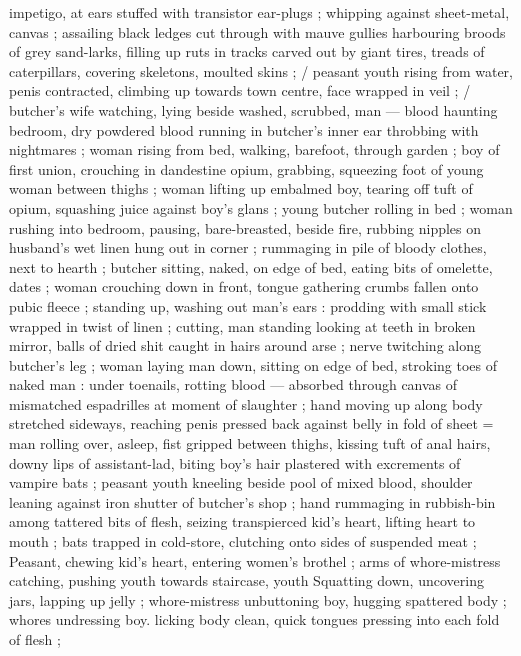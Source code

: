 impetigo, at ears stuffed with transistor ear-plugs ; whipping against 
sheet-metal, canvas ; assailing black ledges cut through with mauve 
gullies harbouring broods of grey sand-larks, filling up ruts in tracks 
carved out by giant tires, treads of caterpillars, covering skeletons, 
moulted skins ; {\slash} peasant youth rising from water, penis contracted, 
climbing up towards town centre, face wrapped in veil ; {\slash} butcher's 
wife watching, lying beside washed, scrubbed, man --- blood 
haunting bedroom, dry powdered blood running in butcher's inner 
ear throbbing with nightmares ; woman rising from bed, walking, 
barefoot, through garden ; boy of first union, crouching in 
dandestine opium, grabbing, squeezing foot of young woman 
between thighs ; woman lifting up embalmed boy, tearing off tuft of 
opium, squashing juice against boy's glans ; young butcher rolling in 
bed ; woman rushing into bedroom, pausing, bare-breasted, beside 
fire, rubbing nipples on husband's wet linen hung out in corner ; 
rummaging in pile of bloody clothes, next to hearth ; butcher sitting, 
naked, on edge of bed, eating bits of omelette, dates ; woman 
crouching down in front, tongue gathering crumbs fallen onto pubic 
fleece ; standing up, washing out man's ears : prodding with small 
stick wrapped in twist of linen ; cutting, man standing looking at teeth 
in broken mirror, balls of dried shit caught in hairs around arse ; 
nerve twitching along butcher's leg ; woman laying man down, sitting 
on edge of bed, stroking toes of naked man : under toenails, rotting 
blood --- absorbed through canvas of mismatched espadrilles at 
moment of slaughter ; hand moving up along body stretched 
sideways, reaching penis pressed back against belly in fold of sheet 
= man rolling over, asleep, fist gripped between thighs, kissing{\td} tuft 
of anal hairs, downy lips of assistant-lad, biting boy's hair plastered 
with excrements of vampire bats{\td} ; peasant youth kneeling beside 
pool of mixed blood, shoulder leaning against iron shutter of 
butcher's shop ; hand rummaging in rubbish-bin among tattered bits 
of flesh, seizing transpierced kid's heart, lifting heart to mouth ; bats 
trapped in cold-store, clutching onto sides of suspended meat ; 
Peasant, chewing kid's heart, entering women's brothel ; arms of 
whore-mistress catching, pushing youth towards staircase, youth 
Squatting down, uncovering jars, lapping up jelly ; whore-mistress 
unbuttoning boy, hugging spattered body ; whores undressing boy. 
licking body clean, quick tongues pressing into each fold of flesh ; 
